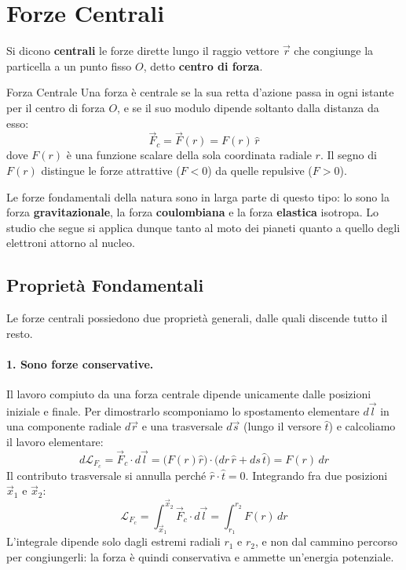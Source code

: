 \section{Forze Centrali}

Si dicono \textbf{centrali} le forze dirette lungo il raggio vettore $\vec{r}$ che congiunge la particella a un punto fisso $O$, detto \textbf{centro di forza}.

\begin{definizione}{Forza Centrale}
Una forza è centrale se la sua retta d'azione passa in ogni istante per il centro di forza $O$, e se il suo modulo dipende soltanto dalla distanza da esso:
\begin{equation}
    \vec{F}_c = \vec{F}(r) = F(r)\,\hat{r}
\end{equation}
dove $F(r)$ è una funzione scalare della sola coordinata radiale $r$. Il segno di $F(r)$ distingue le forze attrattive ($F < 0$) da quelle repulsive ($F > 0$).
\end{definizione}

Le forze fondamentali della natura sono in larga parte di questo tipo: lo sono la forza \textbf{gravitazionale}, la forza \textbf{coulombiana} e la forza \textbf{elastica} isotropa. Lo studio che segue si applica dunque tanto al moto dei pianeti quanto a quello degli elettroni attorno al nucleo.

\subsection{Proprietà Fondamentali}

Le forze centrali possiedono due proprietà generali, dalle quali discende tutto il resto.

\paragraph{1. Sono forze conservative.}
Il lavoro compiuto da una forza centrale dipende unicamente dalle posizioni iniziale e finale. Per dimostrarlo scomponiamo lo spostamento elementare $d\vec{l}$ in una componente radiale $d\vec{r}$ e una trasversale $d\vec{s}$ (lungo il versore $\hat{t}$) e calcoliamo il lavoro elementare:
\begin{equation}
    d\mathcal{L}_{F_c} = \vec{F}_c \cdot d\vec{l}
    = \big(F(r)\hat{r}\big) \cdot \big(dr\,\hat{r} + ds\,\hat{t}\big) = F(r)\,dr
\end{equation}
Il contributo trasversale si annulla perché $\hat{r} \cdot \hat{t} = 0$. Integrando fra due posizioni $\vec{x}_1$ e $\vec{x}_2$:
\begin{equation}
    \mathcal{L}_{F_c} = \int_{\vec{x}_1}^{\vec{x}_2} \vec{F}_c \cdot d\vec{l}
    = \int_{r_1}^{r_2} F(r) \, dr
\end{equation}
L'integrale dipende solo dagli estremi radiali $r_1$ e $r_2$, e non dal cammino percorso per congiungerli: la forza è quindi conservativa e ammette un'energia potenziale.

